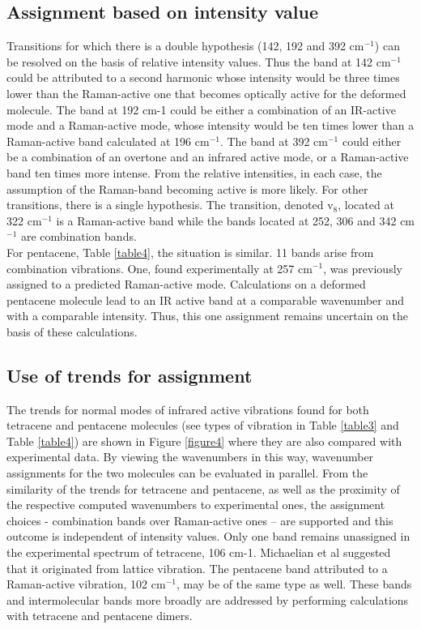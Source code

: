 \subsection*{Assignment based on intensity value}

Transitions for which there is a double hypothesis (142, 192 and 392 cm$^{-1}$) can be resolved on the basis of relative intensity values. Thus the band at 142 cm$^{-1}$ could be attributed to a second harmonic whose intensity would be three times lower than the Raman-active one that becomes optically active for the deformed molecule. The band at 192 cm-1 could be either a combination of an IR-active mode and a Raman-active mode, whose intensity would be ten times lower than a Raman-active band calculated at 196 cm$^{-1}$. The band at 392 cm$^{-1}$ could either be a combination of an overtone and an infrared active mode, or a Raman-active band ten times more intense. From the relative intensities, in each case, the assumption of the Raman-band becoming active is more likely. For other transitions, there is a single hypothesis. The transition, denoted v$_{8}$, located at 322 cm$^{-1}$ is a Raman-active band while the bands located at 252, 306 and 342 cm$^{-1}$ are combination bands.\\ 

For pentacene, Table \ref{table4}, the situation is similar. 11 bands arise from combination vibrations. One, found experimentally at 257 cm$^{-1}$, was previously assigned to a predicted Raman-active mode. Calculations on a deformed pentacene molecule lead to an IR active band at a comparable wavenumber and with a comparable intensity. Thus, this one assignment remains uncertain on the basis of these calculations. 

\subsection*{Use of trends for assignment}

The trends for normal modes of infrared active vibrations found for both tetracene and pentacene molecules (see types of vibration in Table \ref{table3} and Table \ref{table4}) are shown in Figure \ref{figure4} where they are also compared with experimental data. By viewing the wavenumbers in this way, wavenumber assignments for the two molecules can be evaluated in parallel. From the similarity of the trends for tetracene and pentacene, as well as the proximity of the respective computed wavenumbers to experimental ones, the assignment choices - combination bands over Raman-active ones – are supported and this outcome is independent of intensity values. Only one band remains unassigned in the experimental spectrum of tetracene, 106 cm-1. Michaelian et al \cite{michaelian2012far} suggested that it originated from lattice vibration. The pentacene band attributed to a Raman-active vibration, 102 cm$^{-1}$, may be of the same type as well.  These bands and intermolecular bands more broadly are addressed by performing calculations with tetracene and pentacene dimers. 

